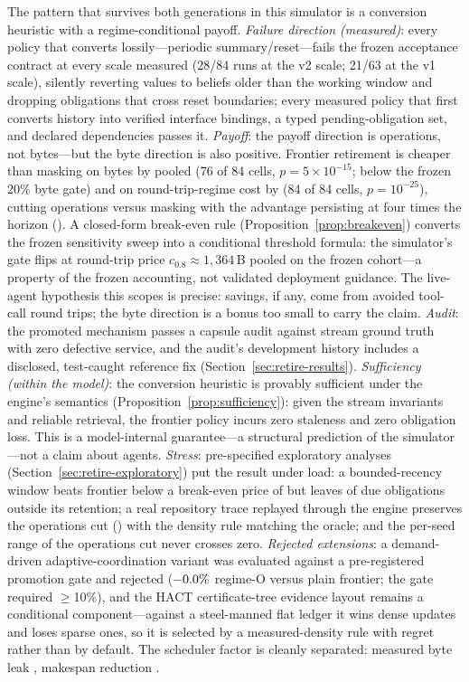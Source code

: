 The pattern that survives both generations in this simulator is a
conversion heuristic with a
regime-conditional payoff. \emph{Failure direction (measured)}:
every policy that
converts lossily---periodic summary/reset---fails the frozen acceptance
contract at every scale measured (28/84 runs at the v2 scale; 21/63 at
the v1 scale), silently reverting values to beliefs older than the
working window and dropping obligations that cross reset boundaries;
every measured policy that first converts history into verified
interface bindings, a typed pending-obligation set, and declared
dependencies passes it.
\emph{Payoff}: the payoff direction is operations, not bytes---but the byte
direction is also positive. Frontier retirement is cheaper than
masking on bytes by \RetwoBytesWin{} pooled (76 of 84 cells,
$p{=}5{\times}10^{-15}$; below the frozen 20\% byte gate) and on
round-trip-regime cost by \RetwoCostOReduction{} (84 of 84 cells,
$p{=}10^{-25}$), cutting operations \RetwoOpsReduction{} versus
masking with the advantage persisting at four times the horizon
(\RetwoLongOpsReduction{}). A closed-form break-even rule
(Proposition~\ref{prop:breakeven}) converts the frozen sensitivity
sweep into a conditional threshold formula: the simulator's gate
flips at round-trip price $c_{0.8}\approx1{,}364$\,B pooled on the
frozen cohort---a property of the frozen accounting, not validated
deployment guidance. The
live-agent hypothesis this scopes is precise: savings, if any,
come from avoided tool-call round trips; the byte direction is a
bonus too small to carry the claim. \emph{Audit}: the promoted
mechanism passes a capsule audit against stream ground truth with zero
defective service, and the audit's development history includes a
disclosed, test-caught reference fix (Section~\ref{sec:retire-results}).
\emph{Sufficiency (within the model)}: the conversion heuristic is
provably sufficient under the engine's semantics
(Proposition~\ref{prop:sufficiency}): given the stream invariants and
reliable retrieval, the frontier policy incurs zero staleness and
zero obligation loss. This is a model-internal guarantee---a
structural prediction of the simulator---not a claim about agents.
\emph{Stress}: pre-specified exploratory analyses
(Section~\ref{sec:retire-exploratory}) put the result under load: a
bounded-recency window beats frontier below a break-even price of
\ExpBhBreakEvenPooled{} but leaves \ExpBhDueExposed{} of due
obligations outside its retention; a real repository trace replayed
through the engine preserves the operations cut (\ExpTraceOpsCut{})
with the density rule matching the oracle; and the per-seed range of
the operations cut never crosses zero.
\emph{Rejected extensions}: a demand-driven adaptive-coordination
variant was evaluated against a pre-registered promotion gate and
rejected ($-0.0\%{}$ regime-O versus plain frontier;
the gate required $\ge$10\%), and the HACT certificate-tree evidence
layout remains a conditional component---against a steel-manned flat
ledger it wins dense updates and loses sparse ones, so it is selected
by a measured-density rule with \RetwoDensityRegret{} regret rather
than by default. The scheduler factor is cleanly separated: measured
byte leak \RetwoSEffectOnBytes{}, makespan reduction
\RetwoMakespanReduction{}.

